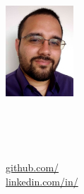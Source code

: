 


\begin{minipage}{1.1in}
  \centering \includegraphics[width=1in]{photo}
\end{minipage}
\begin{minipage}{\dimexpr(\textwidth-1.2in)}
  \begin{minipage}{.6\linewidth}
    \centering
    {\Huge\skills\name} \\
    {\color{highlight}\Large{\role}} \vspace{2em}
  \end{minipage}
  \begin{minipage}{.4\linewidth}
    \raggedleft
    \begin{small}
      \faHome\enspace\address\\
      \faEnvelope\enspace\href{mailto:\email}{\email}\\
      \faLanguage\enspace\languages\\
      \faGithub\enspace\href{https://github.com/\github}{github.com/\github}\\
      \faLinkedin\enspace\href{https://www.linkedin.com/in/\LinkedIn}{linkedin.com/in/\LinkedIn}\\
    \end{small}
  \end{minipage}
  \enskip{}
  {\color{highlight}\hrulefill}
  
\end{minipage}
